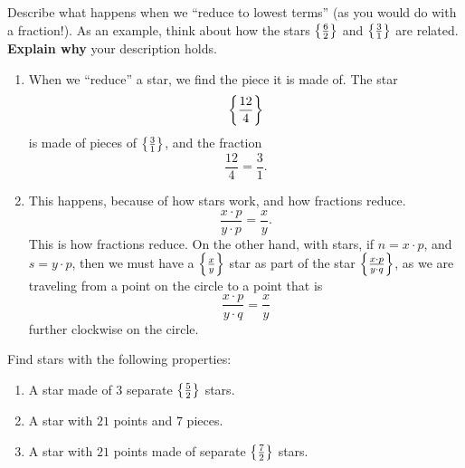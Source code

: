 \documentclass[noauthor,nooutcomes,hints,handout]{ximera}
\begin{document}
\begin{question}
  Describe what happens when we ``reduce to
    lowest terms'' (as you would do with a fraction!). As an example, think about how the stars
    $\left\{\frac{6}{2}\right\}$ and $\left\{\frac{3}{1}\right\}$ are related.  \textbf{Explain why} your description holds.
  \begin{instructorNotes}
    \begin{enumerate}
      \item When we ``reduce'' a star, we find the piece it is made
        of.  The star
        \[
        \left\{\frac{12}{4}\right\}
        \]
        is made of pieces of $\left\{\frac{3}{1}\right\}$, and the fraction
        \[
        \frac{12}{4} = \frac{3}{1}.
        \]
      \item This happens, because of how stars work, and how fractions reduce.
        \[
        \frac{x\cdot p}{y\cdot p} =  \frac{x}{y}.
        \]
        This is how fractions reduce. On the other hand, with stars,
        if $n=x\cdot p$, and $s=y\cdot p$, then we must have a
        $\left\{\frac{x}{y}\right\}$ star as part of the star
        $\left\{\frac{x\cdot p}{y\cdot q}\right\}$, as we are traveling from a
        point on the circle to a point that is
        \[
        \frac{x\cdot p}{y\cdot q} =  \frac{x}{y}
        \]
        further clockwise on the circle.
    \end{enumerate}
  \end{instructorNotes}
\end{question}



\begin{question}
  Find  stars with the following properties:
  \begin{enumerate}
  \item A star made of $3$ separate $\left\{\frac{5}{2}\right\}$ stars.
   \item A star with $21$ points and $7$ pieces. 
   \item A star with $21$ points made of separate $\left\{\frac{7}{2}\right\}$
     stars.
  \end{enumerate}
  
\end{question}
\end{document}
